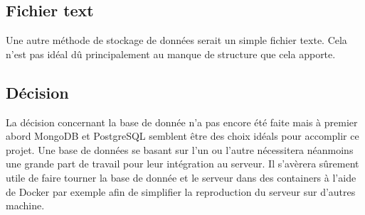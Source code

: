 \subsection{Fichier text}
Une autre méthode de stockage de données serait un simple fichier texte. Cela n'est pas idéal dû principalement au manque de structure que cela apporte.

\subsection{Décision}
La décision concernant la base de donnée n'a pas encore été faite mais à premier abord MongoDB et PostgreSQL semblent être des choix idéals pour accomplir ce projet. Une base de données se basant sur l'un ou l'autre nécessitera néanmoins une grande part de travail pour leur intégration au serveur.
Il s'avèrera sûrement utile de faire tourner la base de donnée et le serveur dans des containers à l'aide de Docker par exemple afin de simplifier la reproduction du serveur sur d'autres machine.

